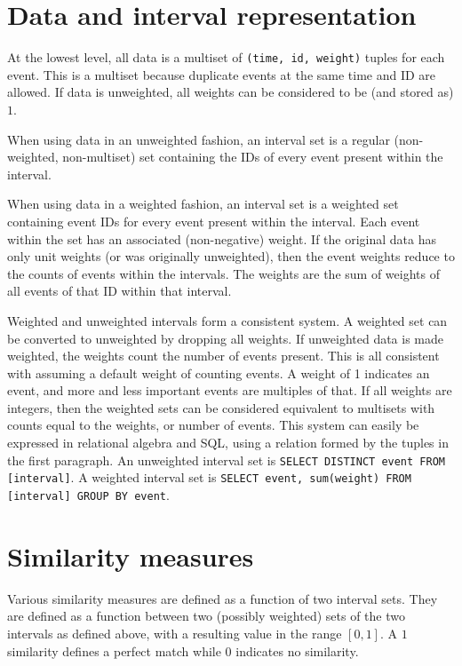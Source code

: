 \documentclass[draft]{article}
\begin{document}
\section{Data and interval representation}
\label{sec:meth-representation}
At the lowest level, all data is a multiset of \texttt{(time, id,
  weight)} tuples for each event.  This is a multiset because
duplicate events at the same time and ID are allowed.  If data is unweighted, all weights
can be considered to be (and stored as) $1$.

When using data in an unweighted fashion, an interval set is
a regular (non-weighted, non-multiset) set containing the IDs
of every event present within the interval.

When using data in a weighted fashion, an interval set is
a weighted set containing event IDs for every event present within the
interval.  Each event within the set has an associated (non-negative)
weight.  If the original data has only unit weights (or was originally
unweighted), then the event weights reduce to the counts of events
within the intervals.  The weights are the sum of weights of all
events of that ID within that interval.

Weighted and unweighted intervals form a consistent system.  A
weighted set can be converted to unweighted by dropping all weights.
If unweighted data is made weighted, the weights count the number of
events present.  This is all consistent with assuming a default
weight of counting events.  A weight of 1 indicates an event, and more
and less important events are multiples of that.  If all weights are
integers, then the weighted sets can be considered equivalent to
multisets with counts equal to the weights, or number of events.  This
system can easily be expressed in relational algebra and SQL, using
a relation formed by the tuples in the first paragraph.  An
unweighted interval set is \texttt{SELECT DISTINCT event FROM
  [interval]}.  A weighted interval set is \texttt{SELECT event,
  sum(weight) FROM [interval] GROUP BY event}.



\section{Similarity measures}
\label{sec:meth-similarity}
Various similarity measures are defined as a function of two interval sets.
They are defined as a function between two (possibly weighted) sets of
the two intervals as defined above, with a resulting value in the
range $[0,1]$.  A $1$ similarity defines a perfect match while $0$
indicates no similarity.
\end{document}
